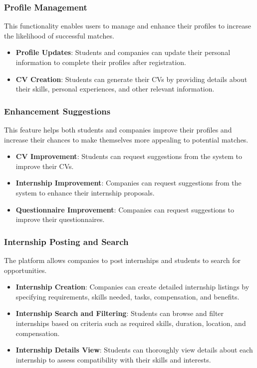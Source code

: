 \subsubsection*{Profile Management} 
This functionality enables users to manage and enhance their profiles to increase the likelihood of successful matches.
\begin{itemize}
    \item \textbf{Profile Updates}: Students and companies can update their personal information to complete their profiles after registration.
    \item \textbf{CV Creation}: Students can generate their CVs by providing details about their skills, personal experiences, and other relevant information.
\end{itemize}

\subsubsection*{Enhancement Suggestions}
This feature helps both students and companies improve their profiles and increase their chances to make themselves more appealing to potential matches.
\begin{itemize}
    \item \textbf{CV Improvement}: Students can request suggestions from the system to improve their CVs.
    \item \textbf{Internship Improvement}: Companies can request suggestions from the system to enhance their internship proposals.
    \item \textbf{Questionnaire Improvement}: Companies can request suggestions to improve their questionnaires.
\end{itemize}

\subsubsection*{Internship Posting and Search} 
The platform allows companies to post internships and students to search for opportunities.
\begin{itemize}
    \item \textbf{Internship Creation}: Companies can create detailed internship listings by specifying requirements, skills needed, tasks, compensation, and benefits.
    \item \textbf{Internship Search and Filtering}: Students can browse and filter internships based on criteria such as required skills, duration, location, and compensation.
    \item \textbf{Internship Details View}: Students can thoroughly view details about each internship to assess compatibility with their skills and interests.
\end{itemize}

